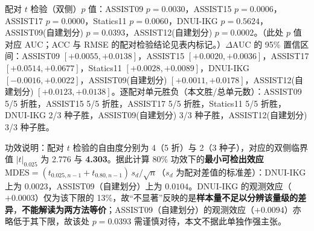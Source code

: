 \begin{table}[t]
{\begin{tabular}{llccccccc}
\bottomrule
\end{tabular}}
\par\smallskip\footnotesize 配对 $t$ 检验（双侧）$p$ 值：ASSIST09 $p=0.0030$，ASSIST15 $p=0.0006$，ASSIST17 $p=0.0000$，Statics11 $p=0.0060$，DNUI-IKG $p=0.5624$，ASSIST09(自建划分) $p=0.0393$，ASSIST12(自建划分) $p=0.0002$。（此处 $p$ 值对应 AUC；ACC 与 RMSE 的配对检验结论见表内标记。）$\Delta$AUC 的 95\% 置信区间：ASSIST09 $[+0.0055,+0.0138]$，ASSIST15 $[+0.0020,+0.0036]$，ASSIST17 $[+0.0514,+0.0677]$，Statics11 $[+0.0028,+0.0089]$，DNUI-IKG $[-0.0016,+0.0022]$，ASSIST09(自建划分) $[+0.0011,+0.0178]$，ASSIST12(自建划分) $[+0.0123,+0.0138]$。逐配对单元胜负（本文胜/总单元数）：ASSIST09 5/5 折胜，ASSIST15 5/5 折胜，ASSIST17 5/5 折胜，Statics11 5/5 折胜，DNUI-IKG 2/3 种子胜，ASSIST09(自建划分) 3/3 种子胜，ASSIST12(自建划分) 3/3 种子胜。
\par\footnotesize 功效说明：配对 $t$ 检验的自由度分别为 4（5 折）与 2（3 种子），对应的双侧临界值 $|t|_{0.025}$ 为 2.776 与 \textbf{4.303}。据此计算 80\% 功效下的\textbf{最小可检出效应} $\mathrm{MDES}=(t_{0.025,n-1}+t_{0.80,n-1})\,s_d/\sqrt{n}$（$s_d$ 为配对差值的标准差）：DNUI-IKG 上为 $0.0023$，ASSIST09（自建划分）上为 $0.0104$。DNUI-IKG 的观测效应（$+0.0003$）仅为该下限的 13\%，故``不显著''反映的是\textbf{样本量不足以分辨该量级的差异}，\textbf{不能解读为两方法等价}；ASSIST09（自建划分）的观测效应（$+0.0094$）亦略低于其下限，故该处 $p=0.0393$ 需谨慎对待，本文不据此单独作强主张。
\end{table}
